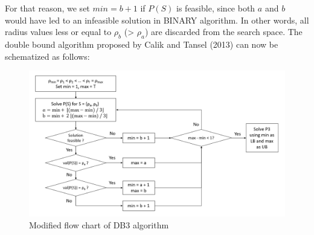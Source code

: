 For that reason, we set $min = b + 1$ if $P(S)$ is feasible, since both $a$ and $b$ would have led to an infeasible solution in BINARY algorithm.
In other words, all radius values less or equal to $\rho_b$ (> $\rho_a$) are discarded from the search space.
The double bound algorithm proposed by Calik and Tansel (2013) can now be schematized as follows:
\begin{figure}[H]
	\begin{center}
		\includegraphics[width=\textwidth]{../imgs/DB3.png}
		\caption{Modified flow chart of DB3 algorithm}
	\end{center}
\end{figure}
